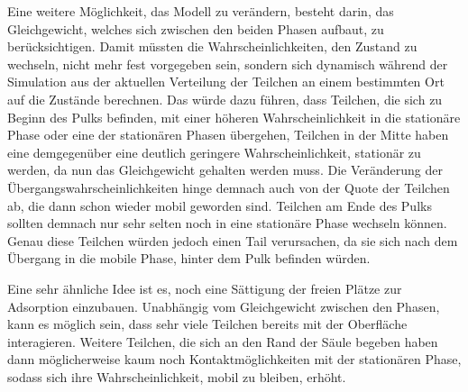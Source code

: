 Eine weitere Möglichkeit, das Modell zu verändern, besteht darin, das Gleichgewicht, welches sich zwischen den beiden Phasen aufbaut, zu berücksichtigen. Damit müssten die Wahrscheinlichkeiten, den Zustand zu wechseln, nicht mehr fest vorgegeben sein, sondern sich dynamisch während der Simulation aus der aktuellen Verteilung der Teilchen an einem bestimmten Ort auf die Zustände berechnen. Das würde dazu führen, dass Teilchen, die sich zu Beginn des Pulks befinden, mit einer höheren Wahrscheinlichkeit in die stationäre Phase oder eine der stationären Phasen übergehen, Teilchen in der Mitte haben eine demgegenüber eine deutlich geringere Wahrscheinlichkeit, stationär zu werden, da nun das Gleichgewicht gehalten werden muss. Die Veränderung der Übergangswahrscheinlichkeiten hinge demnach auch von der Quote der Teilchen ab, die dann schon wieder mobil geworden sind. Teilchen am Ende des Pulks sollten demnach nur sehr selten noch in eine stationäre Phase wechseln können. Genau diese Teilchen würden jedoch einen Tail verursachen, da sie sich nach dem Übergang in die mobile Phase, hinter dem Pulk befinden würden.

Eine sehr ähnliche Idee ist es, noch eine Sättigung der freien Plätze zur Adsorption einzubauen. Unabhängig vom Gleichgewicht zwischen den Phasen, kann es möglich sein, dass sehr viele Teilchen bereits mit der Oberfläche interagieren. Weitere Teilchen, die sich an den Rand der Säule begeben haben dann möglicherweise kaum noch Kontaktmöglichkeiten mit der stationären Phase, sodass sich ihre Wahrscheinlichkeit, mobil zu bleiben, erhöht.

